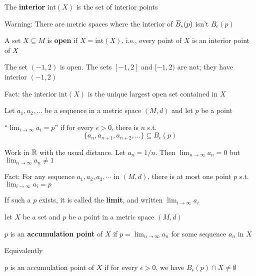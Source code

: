 \documentclass[11pt]{article}
\def \tint {\text{int}}
\begin{document}
\begin{definition}[]
The \textbf{interior} \(\tint(X)\) is the set of interior points
\end{definition}

Warning: There are metric spaces where the interior of \(\barB_\epsilon(p)\) isn't \(B_\epsilon(p)\)

\begin{definition}[]
A set \(X\subseteq M\) is \textbf{open} if \(X=\tint(X)\), i.e., every point of \(X\) is an interior point of \(X\)
\end{definition}

\begin{examplle}[in \(\R\)]
The set \((-1,2)\) is open. The sets \([-1,2]\) and \([-1,2)\) are not; they have interior \((-1,2)\)
\end{examplle}

Fact: the interior \(\tint(X)\) is the unique largest open set contained in \(X\)

Let \(a_1,a_2,\dots\) be a sequence in a metric space \((M,d)\) and let \(p\) be a point
\begin{definition}[]
``\(\lim_{i\to\infty}a_i=p\)'' if for every \(\epsilon>0\), there is \(n\) s.t.
\begin{equation*}
\{a_n,a_{n+1},a_{n+2},\dots\}\subseteq B_\epsilon(p)
\end{equation*}
\end{definition}

\begin{examplle}[]
Work in \(\R\) with the usual distance. Let \(a_n=1/n\). Then \(\lim_{n\to\infty}a_n=0\)
but \(\lim_{n\to\infty}a_n\neq 1\)
\end{examplle}

Fact: For any sequence \(a_1,a_2,a_3,\cdots\) in \((M,d)\), there is at most one point \(p\)
s.t. \(\lim_{i\to\infty}a_i=p\)

If such a \(p\) exists, it is called the \textbf{limit}, and written \(\lim_{i\to\infty}a_i\)

let \(X\) be a set and \(p\) be a point in a metric space \((M,d)\)

\begin{definition}[]
\(p\) is an \textbf{accumulation point} of \(X\) if \(p=\lim_{n\to\infty}a_n\) for some sequence \(a_n\) in \(X\)
\end{definition}

Equivalently
\begin{definition}[]
\(p\) is an accumulation point of \(X\) if for every \(\epsilon>0\), we have \(B_\epsilon(p)\cap X\neq\emptyset\)
\end{definition}
\end{document}
